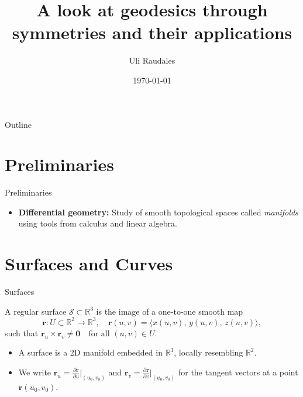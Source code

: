 \documentclass{beamer}
\newcommand{\R}{\mathbb{R}}
\begin{document}
\begin{frame}
	\title{A look at geodesics through symmetries and their applications}
	\author{Uli Raudales}
	\date{\today}
	\titlepage
\end{frame}

\begin{frame}{Outline}
  	\tableofcontents
\end{frame}

\section{Preliminaries}
\begin{frame}{Preliminaries}
	\footnotesize
	\begin{itemize}
		\item \textbf{Differential geometry:} Study of smooth topological spaces called \emph{manifolds} using tools from calculus and linear algebra.
	\end{itemize}
\end{frame}

\section{Surfaces and Curves}
\begin{frame}{Surfaces}
	\begin{definition}[Surface]\label{def:surface}
		A regular surface $\mathcal{S}\subset\R^3$ is the image of a one-to-one smooth map
		\[
			\mathbf{r}: U\subset\R^2 \to \R^3,\quad
			\mathbf{r}(u,v) = \bigl\langle x(u,v),\,y(u,v),\,z(u,v)\bigr\rangle,
		\]
		such that $\mathbf{r}_u \times \mathbf{r}_v \neq \mathbf{0} \quad\text{for all }(u,v)\in U $.
	\end{definition}
	\hfill
	\vspace{1ex}
	\begin{itemize}[<+->]
		\item A surface is a 2D manifold embedded in $\R^3$, locally resembling $\R^2$.
		\item We write $\mathbf{r}_u = \frac{\partial\mathbf{r}}{\partial u}\big|_{(u_0,v_0)}$ and $\mathbf{r}_v = \frac{\partial\mathbf{r}}{\partial v}\big|_{(u_0,v_0)}$ for the tangent vectors at a point $\mathbf{r}(u_0,v_0)$.
	\end{itemize}
\end{frame}
\end{document}
